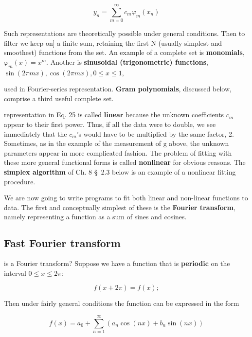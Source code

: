 \begin{itemize}
    \begin{equation}
    y_n = \sum_{m=0}^{\infty}c_{m}\varphi_{m}(x_{n})
    \end{equation}

    Such representations are theoretically possible under general conditions. Then to filter we keep on] a finite sum, retaining the first N (usually simplest and smoothest) functions from the set. An example of a complete set is \textbf{monomials}, $\varphi_{m}(x) = x^{m}$. Another is \textbf{sinusoidal (trigonometric) functions},
        $\sin(2\pi mx), \cos(2\pi mx), 0 \leq x \leq 1$,
    
    used in Fourier-series representation. \textbf{Gram polynomials}, discussed below, comprise a third useful complete set.
\end{itemize}

 representation in Eq. 25 is called \textbf{linear} because the unknown coefficients $c_{m}$ appear to their first power. Thus, if all the data were to double, we see immediately that the $c_{m}$'s would have to be multiplied by the same factor, 2. Sometimes, as in the example of the measurement of g above, the unknown parameters appear in more complicated fashion. The problem of fitting with these more general functional forms is called \textbf{nonlinear} for obvious reasons. The \textbf{simplex algorithm} of Ch. 8 \S\ 2.3 below is an example of a nonlinear fitting procedure.

We are now going to write programs to fit both linear and non-linear functions to data. The first and conceptually simplest of these is the \textbf{Fourier transform}, namely representing a function as a sum of sines and cosines.

\subsection{Fast Fourier transform}
 is a Fourier transform? Suppose we have a function that is \textbf{periodic} on the interval $0 \leq x \leq 2\pi$:

\begin{equation}
f(x + 2\pi) = f(x) ;
\end{equation}

Then under fairly general conditions the function can be expressed in the form

\begin{equation}
f(x) = a_{0} + \sum_{n=1}^{\infty} (a_{n} \cos(nx) + b_{n} \sin(nx))
\end{equation}

